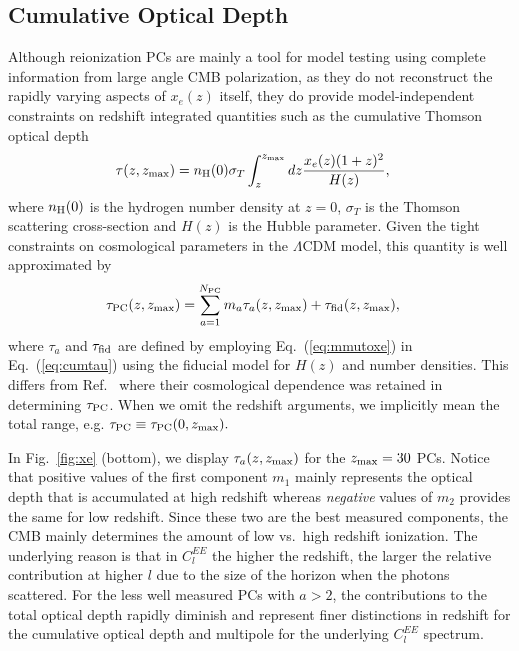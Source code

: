\documentclass[prd,twocolumn,amsmath,amssymb,floatfix,superscriptaddress,nofootinbib]{revtex4-1}
\newcommand{\zmax}{z_{\rm max}}
\begin{document}
%
%
%
%
\subsection{Cumulative Optical Depth}
\label{sec:cumulative}

Although reionization PCs are mainly a tool for model testing using complete information from large angle CMB polarization, as they do not reconstruct the rapidly varying aspects of $x_e(z)$ itself, they do provide model-independent constraints on redshift integrated quantities such as  the cumulative Thomson optical depth
\begin{align}
\tau(z,z_{\rm max}) & = n_{\rm H}(0) \sigma_T \int_z^{z_{\rm max}} dz \frac{x_e(z) (1+z)^{2} }{H(z)},
\label{eq:cumtau}
\end{align}
where $n_{\rm H}(0)$ is the hydrogen number density at $z=0$, $\sigma_T$ is the Thomson scattering cross-section and $H(z)$ is the Hubble parameter. 
Given the tight constraints on cosmological parameters in the $\Lambda$CDM model, this quantity is well approximated by
\begin{align}
\tau_{\rm PC}(z,z_{\rm max})& = \sum_{a=1}^{N_{\rm PC}} m_a \tau_a(z,z_{\rm max}) + \tau_{\rm fid}(z,z_{\rm max}),
\label{eq:cumtauPC}
\end{align}
where $\tau_a$ and $\tau_{\rm fid}$ are defined by employing Eq.~({\ref{eq:mmutoxe}}) in
Eq.~(\ref{eq:cumtau}) using the fiducial model 
for $H(z)$ and number densities.  This differs from Ref.~\cite{Heinrich:2016ojb} where their cosmological dependence was retained in determining $\tau_{\rm PC}$.
 When we omit the redshift arguments, we
implicitly mean the total range, e.g. 
 $
 \tau_{\rm PC}\equiv \tau_{\rm PC}(0,z_{\rm max}).
 $
 
 In Fig.~\ref{fig:xe} (bottom), we display $\tau_a(z,z_{\rm max})$ for the $\zmax=30$ PCs.
 Notice that positive values of the first component $m_1$ mainly represents the optical depth that is accumulated at high redshift whereas {\it negative} values of $m_2$ provides the same for low redshift.    Since these two are the best measured components, the CMB mainly determines the amount of low vs.~high redshift ionization.
The underlying reason is that in $C_l^{EE}$ the higher the redshift, the
larger the relative contribution at higher $l$ due to the size of the horizon when the photons scattered.  For the less well measured PCs with $a>2$, the contributions to the total optical depth rapidly diminish and represent finer distinctions in redshift for the cumulative optical depth and multipole for the underlying $C_l^{EE}$ spectrum.
\end{document}
